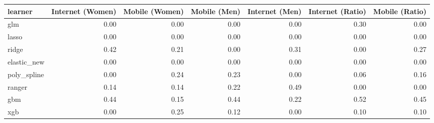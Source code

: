 \begin{table}[ht]
\centering
\begin{tabular}{lrrrrrr}
  \toprule
learner & Internet (Women) & Mobile (Women) & Mobile (Men) & Internet (Men) & Internet (Ratio) & Mobile (Ratio) \\ 
  \midrule
glm & 0.00 & 0.00 & 0.00 & 0.00 & 0.30 & 0.00 \\ 
  lasso & 0.00 & 0.00 & 0.00 & 0.00 & 0.00 & 0.00 \\ 
  ridge & 0.42 & 0.21 & 0.00 & 0.31 & 0.00 & 0.27 \\ 
  elastic\_new & 0.00 & 0.00 & 0.00 & 0.00 & 0.00 & 0.00 \\ 
  poly\_spline & 0.00 & 0.24 & 0.23 & 0.00 & 0.06 & 0.16 \\ 
  ranger & 0.14 & 0.14 & 0.22 & 0.49 & 0.00 & 0.00 \\ 
  gbm & 0.44 & 0.15 & 0.44 & 0.22 & 0.52 & 0.45 \\ 
  xgb & 0.00 & 0.25 & 0.12 & 0.00 & 0.10 & 0.10 \\ 
   \bottomrule
\end{tabular}
\end{table}
